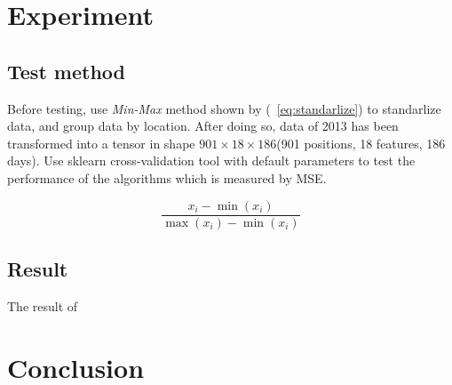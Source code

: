 \documentclass[conference]{IEEEtran}
\begin{document}
\section{Experiment}
\subsection{Test method}
Before testing, use \textit{Min-Max} method shown by (~\ref{eq:standarlize}) to standarlize data, and group data by location. After doing so, data of 2013 has been transformed into a tensor in shape $901\times18\times186$(901 positions, 18 features, 186 days). Use sklearn cross-validation tool with default parameters to test the performance of the algorithms which is measured by MSE.

\begin{equation}
  \frac{x_i-\min \left( x_i \right)}{\max \left( x_i \right) -\min \left( x_i \right)}
\label{eq:standarlize}
\end{equation}

\subsection{Result}
The result of 

\section{Conclusion}





\end{document}
